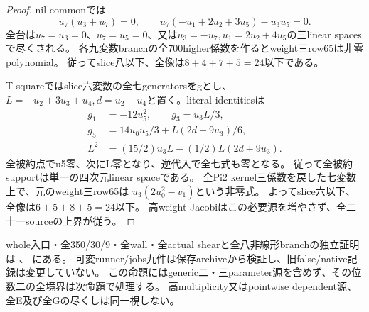 \documentclass[a4paper,11pt]{ltjsarticle}
\theoremstyle{definition}
\begin{document}
\begin{proof}
nil commonでは
\[
 u_7(u_3+u_7)=0,\qquad u_7(-u_1+2u_2+3u_5)-u_3u_5=0.
\]
全台は$u_7=u_3=0$、$u_7=u_5=0$、又は$u_3=-u_7,u_1=2u_2+4u_5$の三linear spacesで尽くされる。
各九変数branchの全700higher係数を作るとweight三row65は非零polynomial。
従ってslice八以下、全像は$8+4+7+5=24$以下である。

T-squareではslice六変数の全七generatorsをgとし、
$L=-u_2+3u_3+u_4,d=u_2-u_4$と置く。literal identitiesは
\[
\begin{aligned}
 g_1&=-12u_5^2,\qquad g_3=u_3L/3,\\
 g_5&=14u_0u_5/3+L(2d+9u_3)/6,\\
 L^2&=(15/2)u_3L-(1/2)L(2d+9u_3).
\end{aligned}
\]
全被約点でu5零、次にL零となり、逆代入で全七式も零となる。
従って全被約supportは単一の四次元linear spaceである。
全Pi2 kernel三係数を戻した七変数上で、元のweight三row65は
$u_3(2u_0^2-v_1)$という非零式。
よってslice六以下、全像は$6+5+8+5=24$以下。
高weight Jacobiはこの必要源を増やさず、全二十一sourceの上界が従う。
\end{proof}
whole入口・全350/30/9・全wall・全actual shearと全八非線形branchの独立証明は
、
にある。
可変runner/jobs九件は保存archiveから検証し、旧false/native記録は変更していない。
この命題にはgeneric二・三parameter源を含めず、その位数二の全境界は次命題で処理する。
高multiplicity又はpointwise dependent源、全E及び全Gの尽くしは同一視しない。
\end{document}
